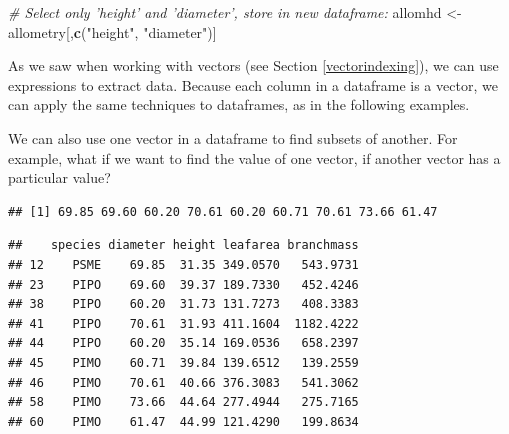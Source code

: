 \documentclass[]{book}
\newenvironment{Shaded}{\begin{snugshade}}{\end{snugshade}}
\newcommand{\CommentTok}[1]{\textcolor[rgb]{0.56,0.35,0.01}{\textit{#1}}}
\newcommand{\DecValTok}[1]{\textcolor[rgb]{0.00,0.00,0.81}{#1}}
\newcommand{\KeywordTok}[1]{\textcolor[rgb]{0.13,0.29,0.53}{\textbf{#1}}}
\newcommand{\NormalTok}[1]{#1}
\newcommand{\OperatorTok}[1]{\textcolor[rgb]{0.81,0.36,0.00}{\textbf{#1}}}
\newcommand{\StringTok}[1]{\textcolor[rgb]{0.31,0.60,0.02}{#1}}
\begin{document}
\begin{Shaded}
\begin{Highlighting}[]
\CommentTok{# Select only 'height' and 'diameter', store in new dataframe:}
\NormalTok{allomhd <-}\StringTok{ }\NormalTok{allometry[,}\KeywordTok{c}\NormalTok{(}\StringTok{"height"}\NormalTok{, }\StringTok{"diameter"}\NormalTok{)]}
\end{Highlighting}
\end{Shaded}

As we saw when working with vectors (see Section \ref{vectorindexing}), we can use expressions to extract data. Because each column in a dataframe is a vector, we can apply the same techniques to dataframes, as in the following examples.

We can also use one vector in a dataframe to find subsets of another. For example, what if we want to find the value of one vector, if another vector has a particular value?

\begin{Shaded}
\end{Shaded}

\begin{verbatim}
## [1] 69.85 69.60 60.20 70.61 60.20 60.71 70.61 73.66 61.47
\end{verbatim}

\begin{Shaded}
\end{Shaded}

\begin{verbatim}
##    species diameter height leafarea branchmass
## 12    PSME    69.85  31.35 349.0570   543.9731
## 23    PIPO    69.60  39.37 189.7330   452.4246
## 38    PIPO    60.20  31.73 131.7273   408.3383
## 41    PIPO    70.61  31.93 411.1604  1182.4222
## 44    PIPO    60.20  35.14 169.0536   658.2397
## 45    PIMO    60.71  39.84 139.6512   139.2559
## 46    PIMO    70.61  40.66 376.3083   541.3062
## 58    PIMO    73.66  44.64 277.4944   275.7165
## 60    PIMO    61.47  44.99 121.4290   199.8634
\end{verbatim}
\end{document}
